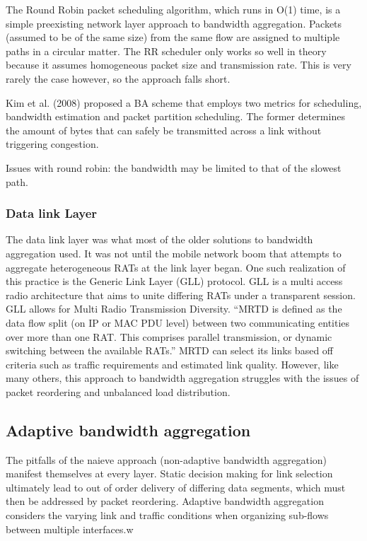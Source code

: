 \documentclass[12pt]{article}
\begin{document}
			The Round Robin packet scheduling algorithm, which runs in O(1) time, is a simple preexisting network layer approach to bandwidth aggregation. Packets (assumed to be of the same size) from the same flow are assigned to multiple paths in a circular matter. The RR scheduler only works so well in theory because it assumes homogeneous packet size and transmission rate. This is very rarely the case however, so the approach falls short.

			Kim et al. (2008) proposed a BA scheme that employs two metrics for scheduling, bandwidth estimation and packet partition scheduling. The former determines the amount of bytes that can safely be transmitted across a link without triggering congestion. 

			Issues with round robin: the bandwidth may be limited to that of the slowest path.

		\subsubsection{Data link Layer}
			The data link layer was what most of the older solutions to bandwidth aggregation used. It was not until the mobile network boom that attempts to aggregate heterogeneous RATs at the link layer began. One such realization of this practice is the Generic Link Layer (GLL) protocol. GLL is a multi access radio architecture that aims to unite differing RATs under a transparent session. GLL allows for Multi Radio Transmission Diversity.
			 ``MRTD is defined as the data flow split (on IP or MAC PDU level) between two communicating entities over more than one RAT. This comprises parallel transmission, or dynamic switching between the available RATs.''\cite{GLL:2005}
			MRTD can select its links based off criteria such as traffic requirements and estimated link quality. However, like many others, this approach to bandwidth aggregation struggles with the issues of packet reordering and unbalanced load distribution.

	\subsection{Adaptive bandwidth aggregation}
		The pitfalls of the naieve approach (non-adaptive bandwidth aggregation) manifest themselves at every layer. Static decision making for link selection ultimately lead to out of order delivery of differing data segments, which must then be addressed by packet reordering. 
		Adaptive bandwidth aggregation considers the varying link and traffic conditions when organizing sub-flows between multiple interfaces.w
\end{document}
